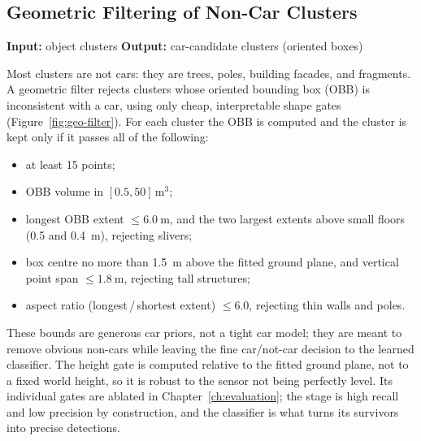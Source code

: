 \subsection{Geometric Filtering of Non-Car Clusters}
\label{sec:pipeline-geometric}

\noindent \textbf{Input:} object clusters \quad \textbar \quad \textbf{Output:} car-candidate clusters (oriented boxes) \vspace{0.5em}

Most clusters are not cars: they are trees, poles, building facades, and
fragments. A geometric filter rejects clusters whose oriented bounding box (OBB)
is inconsistent with a car, using only cheap, interpretable shape gates
(Figure~\ref{fig:geo-filter}). For each
cluster the OBB is computed and the cluster is kept only if it passes all
of the following:

\begin{itemize}
  \item at least \num{15} points;
  \item OBB volume in $[\num{0.5}, \num{50}]\,\si{\meter\cubed}$;
  \item longest OBB extent $\leq \SI{6.0}{\meter}$, and the two largest extents
    above small floors (\SI{0.5}{} and \SI{0.4}{\meter}), rejecting slivers;
  \item box centre no more than \SI{1.5}{\meter} above the fitted ground plane,
    and vertical point span $\leq \SI{1.8}{\meter}$, rejecting tall structures;
  \item aspect ratio (longest\,/\,shortest extent) $\leq \num{6.0}$, rejecting
    thin walls and poles.
\end{itemize}

These bounds are generous car priors, not a tight car model; they are meant to
remove obvious non-cars while leaving the fine car/not-car decision to the
learned classifier. The height gate is computed relative to the fitted
ground plane, not to a fixed world height, so it is robust to the sensor not
being perfectly level. Its individual gates are ablated in Chapter~\ref{ch:evaluation}; the stage is
high recall and low precision by construction, and the
classifier is what turns its survivors into precise detections.

